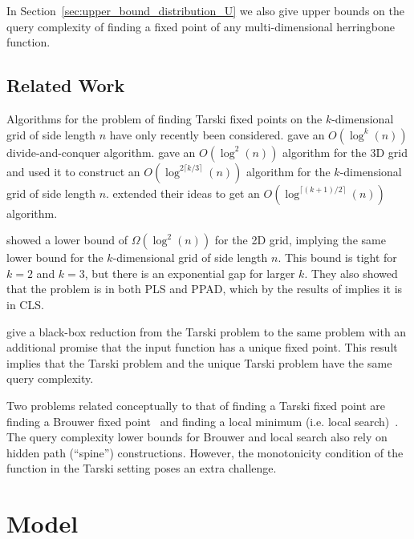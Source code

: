 \documentclass[11pt]{article}
\begin{document}
In Section~\ref{sec:upper_bound_distribution_U} we also give upper bounds on the query complexity of finding a fixed point of any multi-dimensional herringbone function. %


\subsection{Related Work} \label{sec:related_work}

Algorithms for the problem of finding Tarski fixed points on the $k$-dimensional grid of side length $n$ have only recently been considered. \cite{dang2020tarskialgorithm} gave an $O(\log^k (n))$ divide-and-conquer algorithm. \cite{fearnley2022faster} gave an $O(\log^2 (n))$ algorithm for the 3D grid and used it to construct an $O(\log^{2 \lceil k/3 \rceil} (n))$ algorithm for the $k$-dimensional grid of side length $n$. \cite{chen2022improved} extended their ideas to get an $O(\log^{\lceil (k+1)/2 \rceil}(n))$ algorithm.

 \cite{etessami2019tarski} showed a lower bound of $\Omega(\log^2(n))$ for the 2D grid, implying the same lower bound for the $k$-dimensional grid of side length $n$. This bound is tight for $k = 2$ and $k=3$, but there is an exponential gap for larger $k$. They also showed that the problem is in both PLS and PPAD, which by the results of \cite{fearnley2022cls} implies it is in CLS.

\cite{CLY23} give a black-box reduction from the Tarski problem to the same problem with an additional promise that the input function has a unique fixed point. This result  implies that the Tarski problem and the unique Tarski problem have the same query complexity.

Two problems related conceptually to that of finding a Tarski fixed point are finding a Brouwer fixed point~\cite{hirsch1989exponential,chen2005algorithms,chen2007paths} and finding a local minimum (i.e. local search)~\cite{aldous1983minimization,Aaronson06,zhang2009tight,llewellyn1989local,sun2009quantum,santha2004quantum,dinh2010quantum}. The query complexity lower bounds for Brouwer and local search also rely on hidden path (``spine'') constructions. However, the monotonicity condition of the function in the Tarski setting poses an extra challenge.

\section{Model} \label{sec:model}
\end{document}
